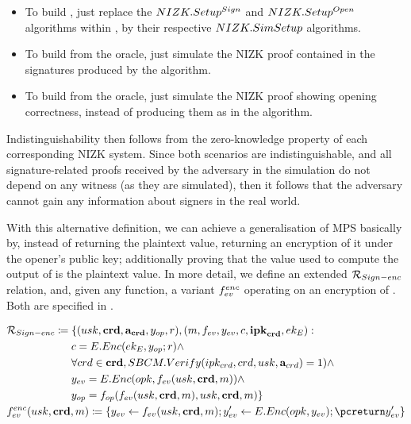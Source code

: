 \begin{itemize}
\item To build \SIMSETUP, just replace the $NIZK.Setup^{Sign}$ and
  $NIZK.Setup^{Open}$ algorithms within \Setup, by their respective
  $NIZK.SimSetup$ algorithms.
\item To build \SIMSIGN from the \SIGN oracle, just simulate the NIZK proof
  contained in the signatures produced by the \Sign algorithm.
\item To build \SIMOPEN from the \OPEN oracle, just simulate the NIZK proof
  showing opening correctness, instead of producing them as in the \Open
  algorithm.
\end{itemize}

Indistinguishability then follows from the zero-knowledge property of each
corresponding NIZK system. Since both scenarios are indistinguishable, and
all signature-related proofs received by the adversary in the simulation do not
depend on any witness (as they are simulated), then it follows that the
adversary cannot gain any information about signers in the real world.

With this alternative definition, we can achieve a generalisation of MPS
basically by, instead of returning the plaintext \yeval value, returning an
encryption of it under the opener's public key; additionally proving 
that the value used to compute the output of \finsp is the plaintext \yeval
value. In more detail, we define an extended $\mathcal{R}_{Sign-enc}$ relation,
and, given any \feval function, a variant $f_{ev}^{enc}$ operating on an
encryption of \yeval. Both are specified in .

\begin{align}
  & \NIZKRel_{\Sign-enc} \coloneqq \lbrace (\usk,\scred,\attrs_{\scred},\yinsp,r),
    (\msg,\feval,\yeval,\Ec,\sipk_{\scred},\Eek): \nonumber \\
  & \hspace*{6.00em}\Ec = \EEnc(\Eek,\yinsp;r) \land \nonumber \\
  & \hspace*{6.00em}\forall \cred \in \scred,\SBCMVerify(\ipk_{\cred},\cred,\usk,
  \attrs_{\cred}) = 1) \land \nonumber \\
  & \hspace*{6.00em}\yeval = \EEnc(\opk,\feval(\usk,\scred,\msg)) \land \nonumber \\
  & \hspace*{6.00em}\yinsp = \finsp(\feval(\usk,\scred,\msg),\usk,\scred,\msg)
    \rbrace \nonumber \\
  & \feval^{enc}(\usk,\scred,\msg) \coloneqq \lbrace \yeval
    \gets \feval(\usk,\scred,\msg); \yeval' \gets \EEnc(\opk,\yeval); \pcreturn
    \yeval' \rbrace \label{eq:uas-mps-funcs}
\end{align}


